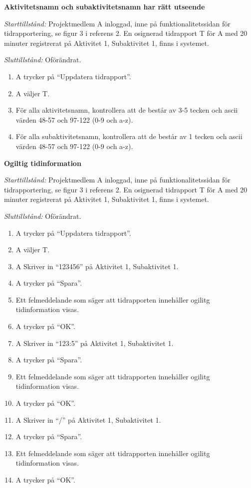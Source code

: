 \documentclass[a4paper]{article}
\begin{document}
\begin{FT}

\item\textbf{Aktivitetsnamn och subaktivitetsnamn har rätt utseende}

\emph{Starttillstånd:} Projektmedlem A inloggad, inne på funktionalitetssidan för tidrapportering, se figur 3 i referens 2. En osignerad tidrapport T för A med 20 minuter registrerat på Aktivitet 1, Subaktivitet 1, finns i systemet.

\emph{Sluttillstånd:} Oförändrat.

\begin{enumerate}
\item A trycker på ``Uppdatera tidrapport''.
\item A väljer T.
\item För alla aktivitetsnamn, kontrollera att de består av 3-5 tecken och ascii värden 48-57 och 97-122 (0-9 och a-z).
\item För alla subaktivitetsnamn, kontrollera att de består av 1 tecken och ascii värden 48-57 och 97-122 (0-9 och a-z).
\end{enumerate}

\item\textbf{Ogiltig tidinformation}

\emph{Starttillstånd:} Projektmedlem A inloggad, inne på funktionalitetssidan för tidrapportering, se figur 3 i referens 2. En osignerad tidrapport T för A med 20 minuter registrerat på Aktivitet 1, Subaktivitet 1, finns i systemet.

\emph{Sluttillstånd:} Oförändrat.

\begin{enumerate}
\item A trycker på ``Uppdatera tidrapport''.
\item A väljer T.
\item A Skriver in ``123456'' på Aktivitet 1, Subaktivitet 1.
\item A trycker på ``Spara''.
\item Ett felmeddelande som säger att tidrapporten innehåller ogilitg tidinformation visas.
\item A trycker på ``OK''.
\item A Skriver in ``123:5'' på Aktivitet 1, Subaktivitet 1.
\item A trycker på ``Spara''.
\item Ett felmeddelande som säger att tidrapporten innehåller ogilitg tidinformation visas.
\item A trycker på ``OK''.
\item A Skriver in ``/'' på Aktivitet 1, Subaktivitet 1.
\item A trycker på ``Spara''.
\item Ett felmeddelande som säger att tidrapporten innehåller ogilitg tidinformation visas.
\item A trycker på ``OK''.
\end{enumerate}



\end{FT}
\end{document}
